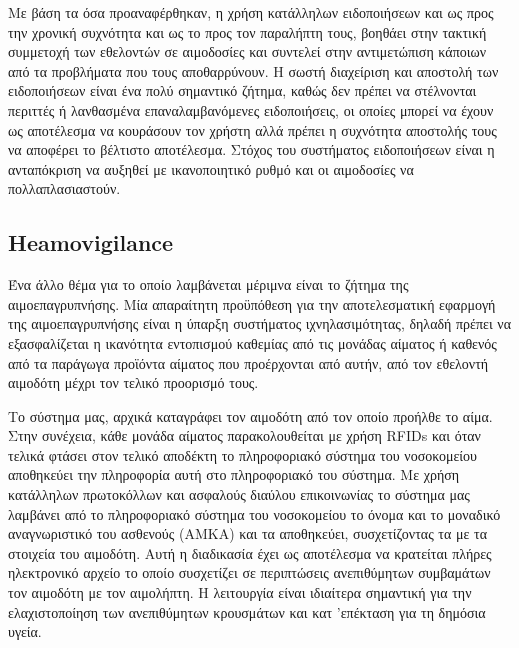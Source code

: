	
		 Με βάση τα όσα προαναφέρθηκαν, η χρήση κατάλληλων ειδοποιήσεων και ως προς την χρονική συχνότητα και ως το προς τον παραλήπτη τους, βοηθάει στην τακτική συμμετοχή των εθελοντών σε αιμοδοσίες και συντελεί στην αντιμετώπιση κάποιων από τα προβλήματα που τους αποθαρρύνουν. Η σωστή διαχείριση και αποστολή των ειδοποιήσεων είναι ένα πολύ σημαντικό ζήτημα, καθώς δεν πρέπει να στέλνονται περιττές ή λανθασμένα επαναλαμβανόμενες ειδοποιήσεις, οι οποίες μπορεί να έχουν ως αποτέλεσμα να κουράσουν τον χρήστη αλλά πρέπει η συχνότητα αποστολής τους να αποφέρει το βέλτιστο αποτέλεσμα. Στόχος του συστήματος ειδοποιήσεων είναι η ανταπόκριση να αυξηθεί με ικανοποιητικό ρυθμό και οι αιμοδοσίες να πολλαπλασιαστούν\cite{Marantidou2007}.
	
	
	\subsection{Heamovigilance}
	
		Ένα άλλο θέμα για το οποίο λαμβάνεται μέριμνα είναι το ζήτημα της αιμοεπαγρυπνήσης. Μία απαραίτητη προϋπόθεση για την αποτελεσματική εφαρμογή της αιμοεπαγρυπνήσης είναι η ύπαρξη συστήματος ιχνηλασιμότητας, δηλαδή πρέπει να εξασφαλίζεται η ικανότητα εντοπισμού καθεμίας από τις μονάδας αίματος ή καθενός από τα παράγωγα προϊόντα αίματος που προέρχονται από αυτήν, από τον εθελοντή αιμοδότη μέχρι τον τελικό προορισμό τους.
		
		
		Το σύστημα μας, αρχικά καταγράφει τον αιμοδότη από τον οποίο προήλθε το αίμα. Στην συνέχεια, κάθε μονάδα αίματος παρακολουθείται με χρήση RFIDs και όταν τελικά φτάσει στον τελικό αποδέκτη το πληροφοριακό σύστημα του νοσοκομείου αποθηκεύει την πληροφορία αυτή στο πληροφοριακό του σύστημα. Με χρήση κατάλληλων πρωτοκόλλων και ασφαλούς διαύλου επικοινωνίας το σύστημα μας λαμβάνει από το πληροφοριακό σύστημα του νοσοκομείου το όνομα και το μοναδικό αναγνωριστικό του ασθενούς (ΑΜΚΑ) και τα αποθηκεύει, συσχετίζοντας τα με τα στοιχεία του αιμοδότη. Αυτή η διαδικασία έχει ως αποτέλεσμα να κρατείται πλήρες ηλεκτρονικό αρχείο το οποίο συσχετίζει σε περιπτώσεις ανεπιθύμητων συμβαμάτων τον αιμοδότη με τον αιμολήπτη. Η λειτουργία είναι ιδιαίτερα σημαντική για την ελαχιστοποίηση των ανεπιθύμητων κρουσμάτων και κατ 'επέκταση για τη δημόσια υγεία.	


	
